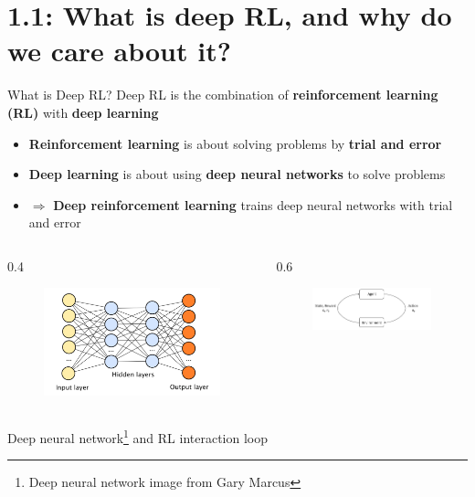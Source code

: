 \documentclass[9pt]{beamer}
\newcommand{\twocolumns}[4]{
\begin{columns}
\begin{column}{#1\textwidth}
    #3
\end{column}
\begin{column}{#2\textwidth}
	#4
\end{column}
\end{columns}
}
\begin{document}
\section{1.1: What is deep RL, and why do we care about it?}

\begin{frame}{What is Deep RL?}
Deep RL is the combination of \textbf{reinforcement learning (RL)} with \textbf{deep learning}

\begin{itemize}
\item \textbf{Reinforcement learning} is about solving problems by \textbf{trial and error}
\item \textbf{Deep learning} is about using \textbf{deep neural networks} to solve problems
\item $\Longrightarrow$ \textbf{Deep reinforcement learning} trains deep neural networks with trial and error
\end{itemize}

\twocolumns{0.4}{0.6}{
\begin{figure}
\centering
\includegraphics[width=\textwidth]{deep-neural-networks}
\end{figure}
}{
\begin{figure}
\centering
\includegraphics[width=\textwidth]{agent-interaction-loop}
\end{figure}
}
\begin{center}
Deep neural network\footnote{Deep neural network image from Gary Marcus} and RL interaction loop
\end{center}
\end{frame}
\end{document}
